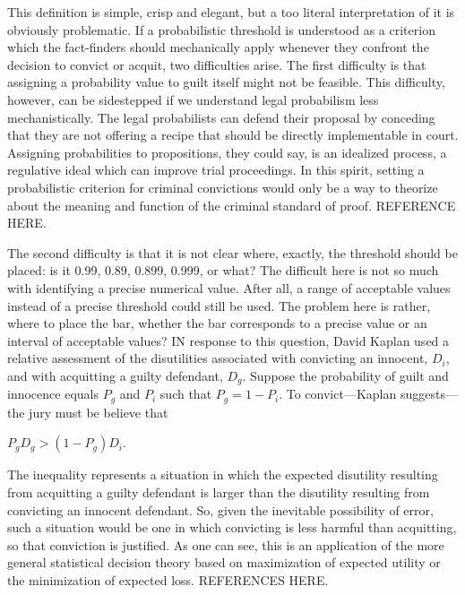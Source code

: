 \documentclass[10pt]{article}
\begin{document}
This definition is simple, crisp and elegant, but a too literal interpretation of it is obviously problematic.  If a probabilistic threshold is understood as a criterion which the fact-finders should mechanically apply whenever they confront the decision to convict or acquit, two difficulties arise. The first difficulty is that assigning a probability value to guilt itself might not be feasible. This difficulty, however,  can be sidestepped if we understand legal probabilism less mechanistically.  The legal probabilists can defend their proposal by conceding that they are not offering a recipe that should be directly implementable in court. Assigning probabilities to propositions, they could say, is an idealized process, a regulative ideal which can improve trial proceedings. In this spirit, setting a probabilistic criterion for criminal convictions would only be a way to theorize about the meaning and function of the criminal standard of proof. REFERENCE HERE. 

The second difficulty is that it is not clear where, exactly, the threshold should be placed: is it 0.99, 0.89, 0.899, 0.999, or what? The difficult here is not so much with identifying a precise numerical value. 
After all, a range of acceptable values instead of a precise threshold could still be used. The problem here is rather, where to place the bar, whether the bar corresponds to a precise value or an interval of acceptable values? IN response to this question, David Kaplan used a relative assessment 
of the disutilities associated with convicting an innocent, $D_i$, and with acquitting a guilty defendant, $D_g$.  
Suppose the probability of guilt and innocence equals $P_g$ and $P_i$ such that $P_g = 1 - P_i$. 
To convict---Kaplan suggests---the jury must be believe that 

\vspace{2mm}

$P_g D_g > (1-P_g) D_i$.

\vspace{2mm}
\noindent
The inequality represents a situation in which the expected disutility resulting from acquitting a guilty defendant is larger than the disutility resulting from 
convicting an innocent defendant. So, given the inevitable possibility of error, such a situation would be one in which 
convicting is less harmful than acquitting, so that conviction is justified. As one can see, this is an application of the more general statistical decision theory based on maximization of expected utility or the minimization of expected loss. REFERENCES HERE. 
\end{document}
